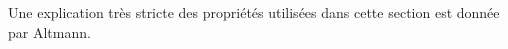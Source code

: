 Une explication très stricte des propriétés utilisées dans cette section est 
donnée par Altmann\label{Altmann}.